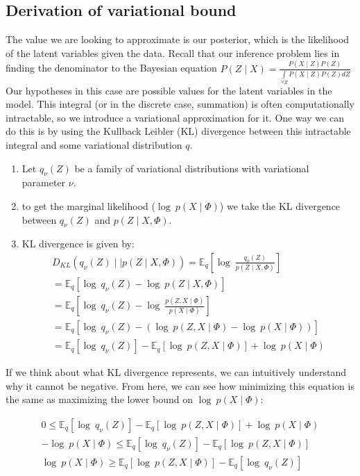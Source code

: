 \subsection{Derivation of variational bound}

The value we are looking to approximate is our posterior, which is the
likelihood of the latent variables given the data. Recall that our
inference problem lies in finding the denominator to the Bayesian
equation
$P(Z\mid X) = \frac{P(X\mid Z)P(Z)}{\int\limits_{\forall Z} P(X\mid Z) P(Z) dZ}$
Our hypotheses in this case are possible values for the latent variables
in the model. This integral (or in the discrete case, summation) is often
computationally intractable, so we introduce a variational approximation for it. One way we can do this is by using the Kullback Leibler (KL) divergence between this intractable integral and some variational distribution $q$.\

\begin{enumerate}
\item Let $q_\nu(Z)$ be a family of variational distributions with variational parameter $\nu$.
\item to get the marginal likelihood ($\log\ p(X\mid \Phi)$) we take the KL divergence between $q_\nu(Z)$ and $p(Z\mid X,\Phi)$.
\item KL divergence is given by:
\begin{align}
\nonumber D_{KL}(q_\nu (Z) \mid \mid  p(Z\mid X,\Phi)) = \mathbb{E}_q[\log\ \frac{q_\nu(Z)}{p(Z\mid X,\Phi)}] \\
\nonumber  = \mathbb{E}_q [\log\ q_\nu(Z)- \log\ p(Z\mid X, \Phi)] \\
\nonumber  = \mathbb{E}_q [\log\ q_\nu(Z)- \log\ \frac{p(Z,X\mid \Phi)}{p(X\mid \Phi)}] \\
\nonumber  = \mathbb{E}_q [\log\ q_\nu(Z)- (\log\ p(Z,X\mid \Phi) - \log\ p(X\mid \Phi))] \\
 = \mathbb{E}_q [\log\ q_\nu(Z)] - \mathbb{E}_q [\log\ p(Z,X\mid \Phi)] + \log\ p(X\mid \Phi) 
\end{align}
\citep{blei:2006} 

\end{enumerate}
If we think about what KL divergence represents, we can intuitively understand why it cannot be negative. From here, we can see how minimizing this equation is the same as maximizing the lower bound on $\log\ p(X\mid \Phi)$:


\begin{align}
\nonumber 0 \leq \mathbb{E}_q [\log\ q_\nu(Z)] - \mathbb{E}_q [\log\ p(Z,X\mid \Phi)] + \log\ p(X\mid \Phi)\\
\nonumber - \log\ p(X\mid \Phi) \leq \mathbb{E}_q [\log\ q_\nu(Z)] - \mathbb{E}_q [\log\ p(Z,X\mid \Phi)]  \\
\log\ p(X\mid \Phi) \geq \mathbb{E}_q [\log\ p(Z,X\mid \Phi)] - \mathbb{E}_q [\log\ q_\nu(Z)] 
\end{align}

